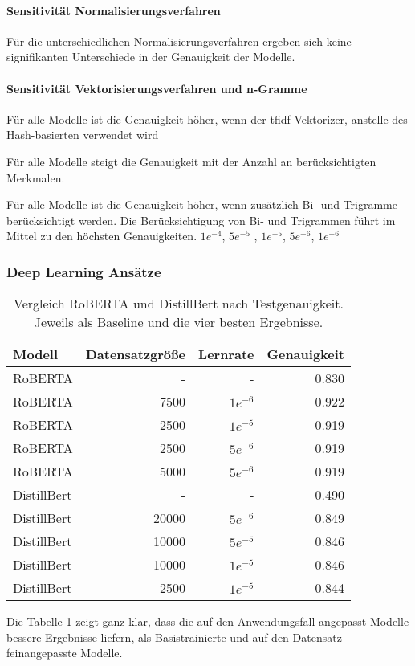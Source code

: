 \paragraph{Sensitivität Normalisierungsverfahren}

Für die unterschiedlichen Normalisierungsverfahren ergeben sich keine signifikanten Unterschiede in der Genauigkeit der Modelle.

\paragraph{Sensitivität Vektorisierungsverfahren und n-Gramme}

Für alle Modelle ist die Genauigkeit höher, wenn der \gls{tfidf}-Vektorizer, anstelle des Hash-basierten verwendet wird

Für alle Modelle steigt die Genauigkeit mit der Anzahl an berücksichtigten Merkmalen.

Für alle Modelle ist die Genauigkeit höher, wenn zusätzlich Bi- und Trigramme berücksichtigt werden.
Die Berücksichtigung von Bi- und Trigrammen führt im Mittel zu den höchsten Genauigkeiten.
$1e^{-4}$, $5e^{-5}$ , $1e^{-5}$, $5e^{-6}$, $1e^{-6}$
\subsubsection{Deep Learning Ansätze}
\begin{table}
    \begin{tabular}{lrrr}
        \toprule
        Modell      & Datensatzgröße & Lernrate  & Genauigkeit \\
        \midrule
        RoBERTA     & -              & -         & 0.830       \\
        RoBERTA     & 7500           & $1e^{-6}$ & 0.922       \\
        RoBERTA     & 2500           & $1e^{-5}$ & 0.919       \\
        RoBERTA     & 2500           & $5e^{-6}$ & 0.919       \\
        RoBERTA     & 5000           & $5e^{-6}$ & 0.919       \\
        DistillBert & -              & -         & 0.490       \\
        DistillBert & 20000          & $5e^{-6}$ & 0.849       \\
        DistillBert & 10000          & $5e^{-5}$ & 0.846       \\
        DistillBert & 10000          & $1e^{-5}$ & 0.846       \\
        DistillBert & 2500           & $1e^{-5}$ & 0.844       \\
        \bottomrule
    \end{tabular}
    \caption{
        Vergleich RoBERTA und DistillBert nach Testgenauigkeit. Jeweils als Baseline und die vier besten Ergebnisse.
    }
    \label{tab:top-models-dl}
\end{table}
Die Tabelle \ref{tab:top-models-dl} zeigt ganz klar, dass die auf den Anwendungsfall angepasst Modelle bessere Ergebnisse liefern, als Basistrainierte und auf den Datensatz feinangepasste Modelle.
